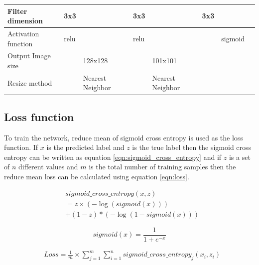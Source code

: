 \documentclass[conference]{IEEEtran}
\begin{document}
\begin{table}[!t]
\begin{tabular}{llllllll}
		Filter dimension    & 3x3              &                  & 3x3              &                  & 3x3              &                &                  \\ \hline
		Activation function & relu             &                  & relu             &                  &                  & sigmoid        &                  \\ \hline
		Output Image size   &                  & 128x128          &                  & 101x101          &                  &                &                  \\ \hline
		Resize method       &                  & Nearest Neighbor &                  & Nearest Neighbor &                  &                &                  \\ \hline
	\end{tabular}
\end{table}



\subsection{Loss function}
To train the network, reduce mean of sigmoid cross entropy is used as the loss function. If $x$ is the predicted label and $z$ is the true label then the sigmoid cross entropy can be written as equation \ref{eqn:sigmoid_cross_entropy} and if $z$ is a set of $n$ different values and $m$ is the total  number of training samples then the reduce mean loss can be calculated using equation \ref{eqn:loss}.

\begin{equation}
\begin{split}
&sigmoid\_cross\_entropy(x,z) \\
&= z\times (-\log(sigmoid(x)) )\\
 &+ (1-z)*(-\log(1-sigmoid(x)))
\end{split}
\label{eqn:sigmoid_cross_entropy}
\end{equation}  


\begin{equation}
sigmoid(x) =\frac{1}{1+e^{-x}}
\label{eqn:sigmoid}
\end{equation}  


\begin{equation}
\begin{split}
&Loss = \frac{1}{m}\times\sum_{j=1}^{m}\sum_{i=1}^{n}sigmoid\_cross\_entropy_j(x_i,z_i) 
\end{split}
\label{eqn:loss}
\end{equation} 
\end{document}
